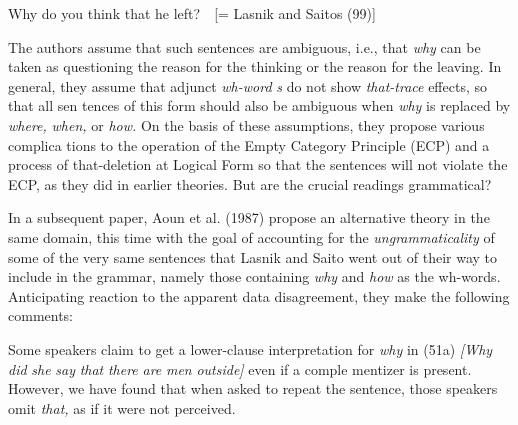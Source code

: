 \setcounter{listWWNumlxileveli}{3}
\begin{listWWNumlxileveli}
\item 
\begin{styleStandard}
Why do you think that he left?\ \ [= Lasnik and Saito{\textquotesingle}s (99)]
\end{styleStandard}


\end{listWWNumlxileveli}
\begin{styleStandard}
The authors assume that such sentences are ambiguous, i.e., that \textit{why}\textit{ }can be taken as questioning the reason for the thinking or the reason for the leaving. In general, they assume that adjunct \textit{wh-word}\textit{ }\textit{s}\textit{ }do not show \textit{that-trace}\textit{ }effects, so that all sen\- tences of this form should also be ambiguous when \textit{why}\textit{ }is replaced by \textit{where,}\textit{ }\textit{when,}\textit{ }or \textit{how.}\textit{ }On the basis of these assumptions, they propose various complica\- tions to the operation of the Empty Category Principle (ECP) and a process of that-deletion at Logical Form so that the sentences will not violate the ECP, as they did in earlier theories. But are the crucial readings grammatical?
\end{styleStandard}


\begin{styleStandard}
In a subsequent paper, Aoun et al. (1987) propose an alternative theory in the same domain, this time with the goal of accounting for the \textit{ungrammaticality}\textit{ }of some of the very same sentences that Lasnik and Saito went out of their way to include in the grammar, namely those containing \textit{why}\textit{ }and \textit{how}\textit{ }as the wh-words. Anticipating reaction to the apparent data disagreement, they make the following comments:
\end{styleStandard}


\begin{styleStandard}
Some speakers claim to get a lower-clause interpretation for \textit{why}\textit{ }in (51a) \textit{[Why}\textit{ }\textit{did}\textit{ }\textit{she}\textit{ }\textit{say}\textit{ }\textit{that}\textit{ }\textit{there}\textit{ }\textit{are}\textit{ }\textit{men}\textit{ }\textit{outside}\textit{]}\textit{ }even if a comple\- mentizer is present. However, we have found that when asked to repeat the sentence, those speakers omit \textit{that,}\textit{ }as if it were not perceived.
\end{styleStandard}


